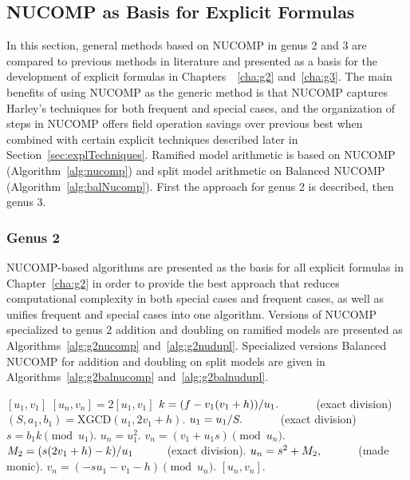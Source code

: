 \subsection{NUCOMP as Basis for Explicit Formulas}\label{sec:nucompbasis}
\label{sec:comparisons}
In this section, general methods based on NUCOMP in genus 2 and 3 are compared
to previous methods in literature and presented as a basis for the development
of explicit formulas in Chapters~~\ref{cha:g2} and~\ref{cha:g3}. The main
benefits of using NUCOMP as the generic method is that NUCOMP captures Harley's
techniques for both frequent and special cases, and the organization of steps in
NUCOMP offers field operation savings over previous best when combined with
certain explicit techniques described later in Section~\ref{sec:explTechniques}.
Ramified model arithmetic is based on NUCOMP (Algorithm~\ref{alg:nucomp}) and
split model arithmetic on Balanced NUCOMP (Algorithm~\ref{alg:balNucomp}). First
the approach for genus 2 is described, then genus 3.


\subsubsection{Genus 2}
NUCOMP-based algorithms are presented as the basis for all explicit formulas in
Chapter~\ref{cha:g2} in order to provide the best approach that reduces
computational complexity in both special cases and frequent cases, as well as
unifies frequent and special cases into one algorithm. Versions of NUCOMP
specialized to genus 2 addition and doubling on ramified models are presented as
Algorithms~\ref{alg:g2nucomp} and~\ref{alg:g2nudupl}. Specialized versions
Balanced NUCOMP for addition and doubling on split models are given in
Algorithms~\ref{alg:g2balnucomp} and~\ref{alg:g2balnudupl}. 



\begin{algorithm}[htbp]
    \caption{Genus 2 Ramified Model Double (NUDUPL)}
    \label{alg:g2nudupl}
    \begin{algorithmic}[1]
    \Require $[u_1,v_1]$
    \Ensure $[u_n,v_n] = 2[u_1,v_1]$
    \State $k = (f - v_1(v_1 + h))/u_1. \quad\quad\quad$ (exact division)
    \State $(S,a_1,b_1) = \mathrm{XGCD}(u_1,2v_1 + h)$.
        \State $u_1 = u_1/S. \quad\quad\quad$ (exact division)
    \EndIf
    \State $s = b_1k \pmod{u_1}$.
        \State $u_n = u_1^2$.
        \State $v_n = (v_1 + u_1s) \pmod{u_n}$.
    \Else
        \State $M_2 = (s(2v_1 + h) - k)/u_1 \quad\quad\quad $(exact division).
        \State $u_n = s^2 + M_2, \quad\quad\quad $ (made monic).
        \State $v_n = (-su_1 - v_1 - h) \pmod{u_n}$.
    \EndIf
    \State \Return $[u_n,v_n]$.
    \end{algorithmic}
    \end{algorithm}

